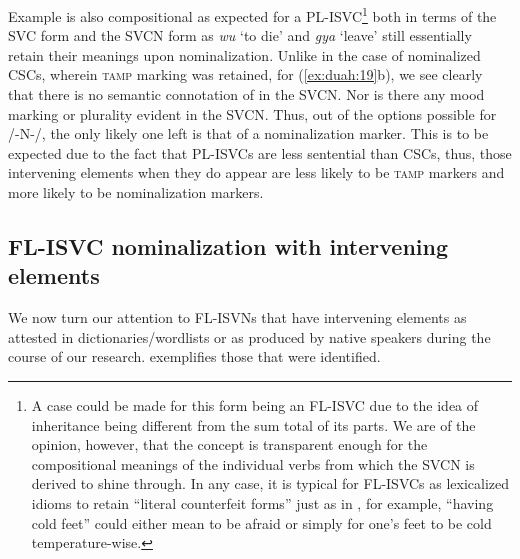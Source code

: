 \documentclass[output=paper,modfonts,nonflat,
colorlinks, citecolor=brown,
]{langsci/langscibook}
\begin{document}
\clearpage
Example  is also compositional as expected for a PL-ISVC\footnote{A case could be made for this form being an FL-ISVC due to the idea of inheritance being different from the sum total of its parts. We are of the opinion, however, that the concept is transparent enough for the compositional meanings of the individual verbs from which the SVCN is derived to shine through. In any case, it is typical for FL-ISVCs as lexicalized idioms to retain “literal counterfeit forms” just as in , for example, “having cold feet” could either mean to be afraid or simply for one’s feet to be cold temperature-wise.} both in terms of the SVC form and the SVCN form as \textit{wu} ‘to die’ and \textit{gya} ‘leave’ still essentially retain their meanings upon nominalization. Unlike in the case of nominalized CSCs, wherein \textsc{tamp} marking was retained, for (\ref{ex:duah:19}b), we see clearly that there is no semantic connotation of  in the SVCN. Nor is there any mood marking or plurality evident in the SVCN. Thus, out of the options possible for /-N-/, the only likely one left is that of a nominalization marker. This is to be expected due to the fact that PL-ISVCs are less sentential than CSCs, thus, those intervening elements when they do appear are less likely to be \textsc{tamp} markers and more likely to be nominalization markers.

\subsection{FL-ISVC nominalization with intervening elements}
We now turn our attention to FL-ISVNs that have intervening elements as attested in dictionaries/wordlists or as produced by native speakers during the course of our research.  exemplifies those that were identified.
\end{document}
